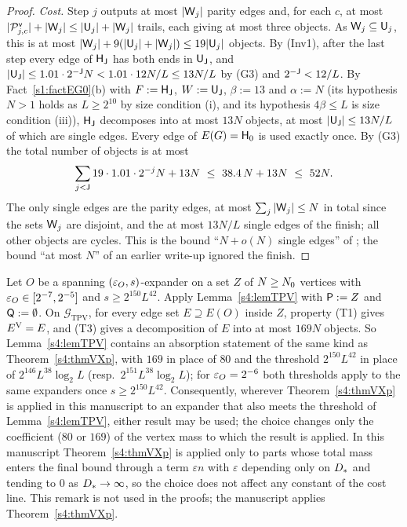 \begin{proof}
\emph{Cost.} Step $j$ outputs at most $|\mathsf{W}_j|$ parity edges and, for each $c$, at most
$|\mathcal{P}^{\mathsf{v}}_{j,c}|+|\mathsf{W}_j|\le|\mathsf{U}_j|+|\mathsf{W}_j|$ trails, each giving at most three objects. As $\mathsf{W}_j\subseteq\mathsf{U}_j$, this
is at most $|\mathsf{W}_j|+9(|\mathsf{U}_j|+|\mathsf{W}_j|)\le19|\mathsf{U}_j|$ objects. By (Inv1), after the last step every edge of
$\mathsf{H}_{\mathsf{J}}$ has both ends in $\mathsf{U}_{\mathsf{J}}$, and $|\mathsf{U}_{\mathsf{J}}|\le1.01\cdot2^{-\mathsf{J}}N<1.01\cdot12N/L\le13N/L$ by (G3) and
$2^{-\mathsf{J}}<12/L$. By Fact~\ref{s1:factEG0}(b) with $F:=\mathsf{H}_{\mathsf{J}}$, $W:=\mathsf{U}_{\mathsf{J}}$, $\beta:=13$ and $\alpha:=N$ (its hypothesis $N>1$ holds as $L\ge2^{10}$ by
size condition (i), and its hypothesis $4\beta\le L$ is size condition (iii)), $\mathsf{H}_{\mathsf{J}}$ decomposes into at most $13N$ objects, at most $|\mathsf{U}_{\mathsf{J}}|\le13N/L$ of which are
single edges. Every edge of $E(G)=\mathsf{H}_0$ is used exactly once. By (G3) the total number of objects is at most
\[
\sum_{j<\vJ}19\cdot1.01\cdot2^{-j}N+13N\ \le\ 38.4\,N+13N\ \le\ 52N .
\]
The only single edges are the parity edges, at most
$\sum_j|\mathsf{W}_j|\le N$ in total since the sets $\mathsf{W}_j$ are disjoint, and the at most $13N/L$ single edges of the
finish; all other objects are cycles. This is the bound ``$N+o(N)$ single edges'' of ; the bound ``at most
$N$'' of an earlier write-up ignored the finish.
\end{proof}

\begin{remark}\label{s4:remTPVVX}
Let $O$ be a spanning $(\varepsilon_O,s)$-expander on a set $Z$ of $N\ge N_{0}$ vertices with $\varepsilon_O\in[2^{-7},2^{-5}]$ and
$s\ge2^{150}L^{42}$. Apply Lemma~\ref{s4:lemTPV} with $\mathsf{P}:=Z$ and $\mathsf{Q}:=\emptyset$. On
$\mathcal G_{\mathrm{TPV}}$, for every edge set $E\supseteq E(O)$ inside $Z$, property (T1) gives $E^{\mathrm{V}}=E$, and (T3)
gives a decomposition of $E$ into at most $169N$ objects. So Lemma~\ref{s4:lemTPV} contains an absorption statement of
the same kind as Theorem~\ref{s4:thmVXp}, with $169$ in place of $80$ and the threshold $2^{150}L^{42}$ in place of
$2^{146}L^{38}\log_2L$ (resp.\ $2^{151}L^{38}\log_2L$); for $\varepsilon_O=2^{-6}$ both thresholds apply to the same
expanders once $s\ge2^{150}L^{42}$. Consequently, wherever Theorem~\ref{s4:thmVXp} is applied in this manuscript to an
expander that also meets the threshold of Lemma~\ref{s4:lemTPV}, either result may be used; the choice changes only
the coefficient ($80$ or $169$) of the vertex mass to which the result is applied. In this manuscript
Theorem~\ref{s4:thmVXp} is applied only to parts whose total mass enters the final bound through a term $\varepsilon n$ with
$\varepsilon$ depending only on $D_{*}$ and tending to $0$ as $D_{*}\to\infty$, so the choice does not affect any constant of the cost line. This remark is not used in the proofs; the
manuscript applies Theorem~\ref{s4:thmVXp}.
\end{remark}
